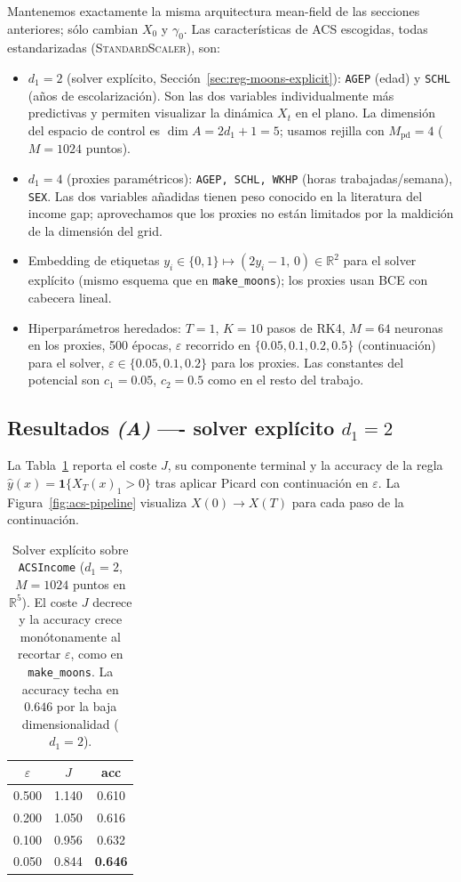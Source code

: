 \documentclass[11pt, a4paper]{article}
\theoremstyle{definition}
\newcommand{\R}{\mathbb{R}}
\newcommand{\eps}{\varepsilon}
\begin{document}
Mantenemos exactamente la misma arquitectura mean-field de las
secciones anteriores; sólo cambian $X_0$ y $\gamma_0$. Las
características de ACS escogidas, todas estandarizadas
(\textsc{StandardScaler}), son:
\begin{itemize}
  \item $d_1 = 2$ (solver explícito, Sección~\ref{sec:reg-moons-explicit}):
        \texttt{AGEP} (edad) y \texttt{SCHL} (años de escolarización).
        Son las dos variables individualmente más predictivas y
        permiten visualizar la dinámica $X_t$ en el plano. La
        dimensión del espacio de control es $\dim A = 2d_1+1 = 5$;
        usamos rejilla con $M_{\text{pd}}=4$ ($M=1024$ puntos).
  \item $d_1 = 4$ (proxies paramétricos):
        \texttt{AGEP, SCHL, WKHP} (horas trabajadas/semana),
        \texttt{SEX}. Las dos variables añadidas tienen peso conocido
        en la literatura del income gap; aprovechamos que los
        proxies no están limitados por la maldición de la dimensión
        del grid.
  \item Embedding de etiquetas
        $y_i \in \{0,1\} \mapsto (2y_i-1,\,0)\in\R^2$ para el solver
        explícito (mismo esquema que en \texttt{make\_moons}); los
        proxies usan BCE con cabecera lineal.
  \item Hiperparámetros heredados:
        $T=1$, $K=10$ pasos de RK4, $M=64$ neuronas en los proxies,
        500 épocas, $\eps$ recorrido en $\{0.05,0.1,0.2,0.5\}$
        (continuación) para el solver, $\eps\in\{0.05,0.1,0.2\}$
        para los proxies. Las constantes del potencial son
        $c_1=0.05$, $c_2=0.5$ como en el resto del trabajo.
\end{itemize}

\subsection{Resultados \emph{(A)} ---- solver explícito
$d_1=2$}
\label{ssec:res-acs-explicit}

La Tabla~\ref{tab:acs-explicito} reporta el coste $J$, su
componente terminal y la accuracy de la regla
$\hat y(x) = \mathbf{1}\{X_T(x)_1 > 0\}$ tras aplicar Picard con
continuación en $\eps$. La Figura~\ref{fig:acs-pipeline} visualiza
$X(0)\to X(T)$ para cada paso de la continuación.

\begin{table}[H]
\centering
\begin{tabular}{ccc}
\toprule
$\eps$ & $J$ & acc \\
\midrule
0.500 & 1.140 & 0.610 \\
0.200 & 1.050 & 0.616 \\
0.100 & 0.956 & 0.632 \\
0.050 & 0.844 & \textbf{0.646} \\
\bottomrule
\end{tabular}
\caption{Solver explícito sobre \texttt{ACSIncome} ($d_1=2$,
$M=1024$ puntos en $\R^5$). El coste $J$ decrece y la accuracy
crece monótonamente al recortar $\eps$, como en \texttt{make\_moons}.
La accuracy techa en $0.646$ por la baja dimensionalidad
($d_1=2$).\label{tab:acs-explicito}}
\end{table}
\end{document}
